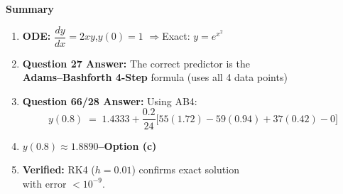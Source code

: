 \documentclass[12pt]{beamer}
\begin{document}
\begin{frame}{\textbf{Summary}}
  \begin{center}
    \vfill
    \begin{enumerate}
      \item \textbf{ODE:}\; $\dfrac{dy}{dx} = 2xy$,\quad $y(0) = 1$
            \quad$\Rightarrow$\quad Exact: $y = e^{x^2}$

      \vspace{0.8em}
      \item \textbf{Question 27 Answer:}\; The correct predictor is the\\
            \textbf{Adams--Bashforth 4-Step} formula (uses all 4 data points)

      \vspace{0.8em}
      \item \textbf{Question 66/28 Answer:}\; Using AB4:
            \[
              y(0.8) \;=\; 1.4333 + \frac{0.2}{24}\bigl[55(1.72) - 59(0.94) + 37(0.42) - 0\bigr]
            \]
            \vspace{-0.5em}

      \vspace{0.3em}
      \item[] \LARGE\textbf{\textcolor{madblue}{$y(0.8) \approx 1.8890$\quad --\quad Option (c)}}

      \vspace{0.8em}
      \normalsize
      \item \textbf{Verified:}\; RK4 ($h = 0.01$) confirms exact solution\\
            with error $< 10^{-9}$.\;
            \textcolor{okgreen}{\checkmark}
    \end{enumerate}
    \vfill
  \end{center}
\end{frame}
\end{document}
